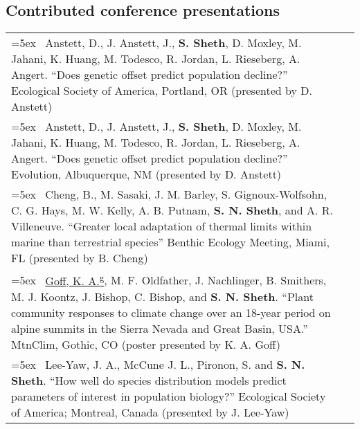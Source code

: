 \documentclass[11pt,english]{article}\usepackage[]{graphicx}\usepackage[]{xcolor}
\providecommand{\tabularnewline}{\\}
\begin{document}
\subsection*{Contributed conference presentations} %

\renewcommand{\arraystretch}{1.2}
\begin{tabularx}{\textwidth}{@{}>{\raggedright}p{5.25in} >{\raggedleft}X@{}}

\hangindent=5ex \ Anstett, D., J. Anstett, J., \textbf{S. Sheth}, D. Moxley, M. Jahani, K. Huang, M. Todesco, R. Jordan, L. Rieseberg, A. Angert. ``Does genetic offset predict population decline?'' Ecological Society of America, Portland, OR (presented by D. Anstett) & 2023 \tabularnewline

\hangindent=5ex \ Anstett, D., J. Anstett, J., \textbf{S. Sheth}, D. Moxley, M. Jahani, K. Huang, M. Todesco, R. Jordan, L. Rieseberg, A. Angert. ``Does genetic offset predict population decline?'' Evolution, Albuquerque, NM (presented by D. Anstett) & 2023 \tabularnewline

\hangindent=5ex \ Cheng, B., M. Sasaki, J. M. Barley, S. Gignoux-Wolfsohn, C. G. Hays, M. W. Kelly, A. B. Putnam, \textbf{S. N. Sheth}, and A. R. Villeneuve. ``Greater local adaptation of thermal limits within marine than terrestrial species'' Benthic Ecology Meeting, Miami, FL (presented by B. Cheng) & 2023 \tabularnewline

\hangindent=5ex \ \underline{Goff, K. A.\textsuperscript{g}}, M. F. Oldfather, J. Nachlinger, B. Smithers, M. J. Koontz, J. Bishop, C. Bishop, and \textbf{S. N. Sheth}. ``Plant community responses to climate change over an 18-year period on alpine summits in the Sierra Nevada and Great Basin, USA.'' MtnClim, Gothic, CO (poster presented by K. A. Goff) & 2022 \tabularnewline

\hangindent=5ex \ Lee-Yaw, J. A., McCune J. L., Pironon, S. and \textbf{S. N. Sheth}. ``How well do species distribution models predict parameters of interest in population biology?'' Ecological Society of America; Montreal, Canada (presented by J. Lee-Yaw) & 2022 \tabularnewline

\end{tabularx}
\end{document}
